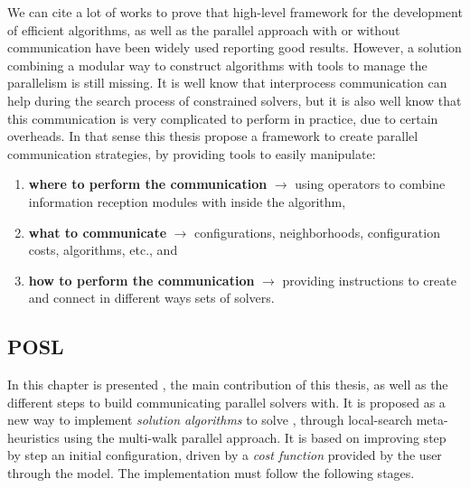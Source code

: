 We can cite a lot of works to prove that high-level framework for the development of efficient algorithms, as well as the parallel approach with or without communication have been widely used reporting good results. However, a solution combining a modular way to construct algorithms with tools to manage the parallelism is still missing. It is well know that interprocess communication can help during the search process of constrained solvers, but it is also well know that this communication is very complicated to perform in practice, due to certain overheads. In that sense this thesis propose a framework to create parallel communication strategies, by providing tools to easily manipulate:
\begin{enumerate}
\item \textbf{where to perform the communication} $\rightarrow$ using operators to combine information reception modules with \cms{} inside the algorithm, 
\item \textbf{what to communicate} $\rightarrow$ configurations, neighborhoods, configuration costs, algorithms, etc., and
\item \textbf{how to perform the communication} $\rightarrow$ providing instructions to create and connect in different ways sets of solvers.
\end{enumerate}


\subsection{POSL}

In this chapter is presented \posl{}, the main contribution of this thesis, as well as the different steps to build communicating parallel solvers with. It is proposed as a new way to implement \textit{solution algorithms} to solve \CSPs, through local-search meta-heuristics using the multi-walk parallel approach. It is based on improving step by step an initial configuration, driven by a \textit{cost function} provided by the user through the model. The implementation must follow the following stages.

